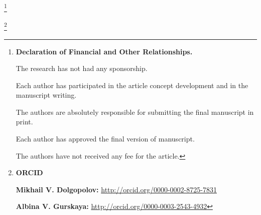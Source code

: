 \RuDate





\newpage



\makeentitle







\smallskip





\thanks{{\bf Declaration of Financial and Other Relationships.}

The research has not had any sponsorship.

Each author has participated in the article concept development and in the manuscript writing.

The authors are absolutely responsible for submitting the final manuscript in print.

Each author has approved the final version of manuscript.

The authors have not received any fee for the article.

}







\thanks{{\bf ORCID}



{\bf  Mikhail V. Dolgopolov:} \url{http://orcid.org/0000-0002-8725-7831}



{\bf  Albina V. Gurskaya:} \url{http://orcid.org/0000-0003-2543-4932}

}



\newpage






\EngRef



